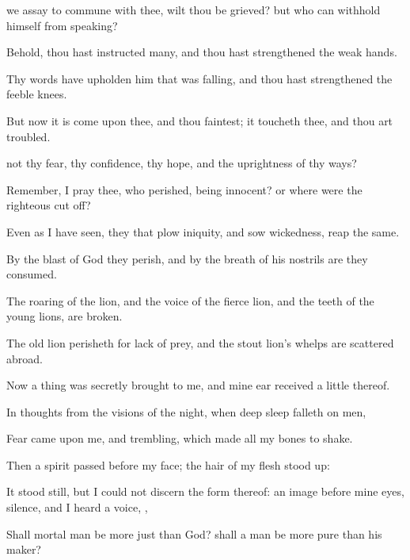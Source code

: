 { we
assay to
commune with thee, wilt thou be
grieved? but who
can
withhold himself from
speaking?

Behold, thou hast
instructed
many, and thou hast
strengthened the
weak
hands.

Thy
words have
upholden him that was
falling, and thou hast
strengthened the
feeble
knees.

But now it is
come upon thee, and thou
faintest; it
toucheth thee, and thou art
troubled.

 not
{} thy
fear, thy
confidence, thy
hope, and the
uprightness of thy
ways?


\par }{\PP {}Remember, I pray thee, who
{}
perished, being
innocent? or
where were the
righteous cut
off?

Even as I have
seen, they that
plow
iniquity, and
sow
wickedness,
reap the same.

By the
blast of
God they
perish, and by the
breath of his
nostrils are they
consumed.

The
roaring of the
lion, and the
voice of the fierce
lion, and the
teeth of the young
lions, are
broken.

The old
lion
perisheth for
lack of
prey, and the stout
lion’s
whelps are scattered
abroad.


\par }{\PP {}Now a
thing was secretly
brought to me, and mine
ear
received a
little thereof.

In
thoughts from the
visions of the
night, when deep
sleep
falleth on
men,

Fear
came upon me, and
trembling, which made
all my
bones to
shake.

Then a
spirit
passed before my
face; the
hair of my
flesh stood
up:

It stood
still, but I could not
discern the
form thereof: an
image
{} before mine
eyes,
{}
silence, and I
heard a
voice,
{},

Shall mortal
man be more
just than
God? shall a
man be more
pure than his
maker?

}
